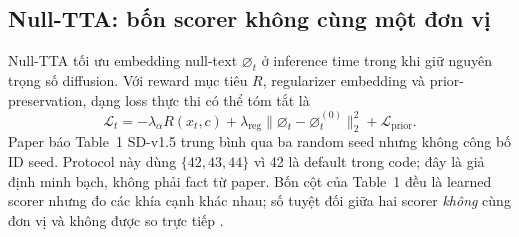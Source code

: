 \documentclass[11pt,a4paper]{article}
\begin{document}
\subsection{Null-TTA: bốn scorer không cùng một đơn vị}

Null-TTA tối ưu embedding null-text $\varnothing_t$ ở inference time trong khi giữ nguyên trọng số diffusion. Với reward mục tiêu $R$, regularizer embedding và prior-preservation, dạng loss thực thi có thể tóm tắt là
\begin{equation}
\mathcal{L}_t = -\lambda_{\alpha}R(x_t,c)
 + \lambda_{\mathrm{reg}}\lVert\varnothing_t-\varnothing_t^{(0)}\rVert_2^2
 + \mathcal{L}_{\mathrm{prior}}.
\end{equation}
Paper báo Table~1 SD-v1.5 trung bình qua ba random seed nhưng không công bố ID seed. Protocol này dùng $\{42,43,44\}$ vì 42 là default trong code; đây là giả định minh bạch, không phải fact từ paper. Bốn cột của Table~1 đều là learned scorer nhưng đo các khía cạnh khác nhau; số tuyệt đối giữa hai scorer \emph{không} cùng đơn vị và không được so trực tiếp \citep{Kim2026NullTTA,NullTTACode}.
\end{document}
